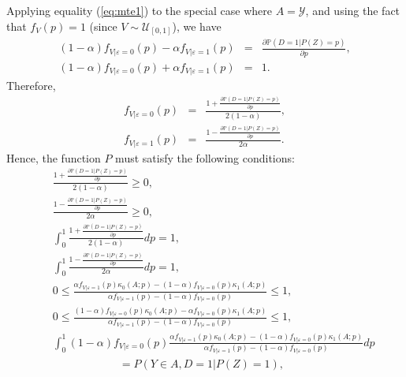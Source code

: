\documentclass[11pt,reqno]{amsart}
\theoremstyle{plain}
\numberwithin{equation}{section}
\begin{document}
Applying equality (\ref{eq:mte1}) to the special case where $A=\mathcal Y$, and using the fact that $f_{V}(p)=1$ (since $V\sim \mathcal U_{[0,1]}$), we have 
\begin{eqnarray*}
(1-\alpha) f_{V\vert \varepsilon=0}(p) - \alpha f_{V\vert \varepsilon=1}(p) &=& \frac{\partial \mathbb P(D=1 \vert P(Z)=p) }{\partial p},\\
(1-\alpha) f_{V\vert \varepsilon=0}(p) +\alpha f_{V\vert \varepsilon=1}(p)&=& 1.
\end{eqnarray*}
Therefore,
\begin{eqnarray*}
f_{V\vert \varepsilon=0}(p)  &=&\frac{1+ \frac{\partial \mathbb P(D=1 \vert P(Z)=p) }{\partial p}}{2(1-\alpha)},\\
f_{V\vert \varepsilon=1}(p)  &=&\frac{1- \frac{\partial \mathbb P(D=1 \vert P(Z)=p) }{\partial p}}{2\alpha}.
\end{eqnarray*}
Hence, the function $P$ must satisfy the following conditions:
\begin{eqnarray}
 && \frac{1+ \frac{\partial \mathbb P(D=1 \vert P(Z)=p) }{\partial p}}{2(1-\alpha)} \geq 0,\label{eq:P1}\\
&&  \frac{1- \frac{\partial \mathbb P(D=1 \vert P(Z)=p) }{\partial p}}{2\alpha} \geq 0, \label{eq:P2}\\
&& \int^1_0  \frac{1+ \frac{\partial \mathbb P(D=1 \vert P(Z)=p) }{\partial p}}{2(1-\alpha)} dp = 1,\label{eq:P3}\\
&& \int^1_0 \frac{1- \frac{\partial \mathbb P(D=1 \vert P(Z)=p) }{\partial p}}{2\alpha} dp = 1 \label{eq:P4},\\
&& 0 \leq \frac{\alpha f_{V\vert \varepsilon=1}(p)\kappa_0(A;p)-\left(1-\alpha\right)f_{V\vert \varepsilon=0}(p)\kappa_1(A;p)}{\alpha f_{V\vert \varepsilon=1}(p)-\left(1-\alpha\right)f_{V\vert \varepsilon=0}(p)} \leq 1, \label{eq:P5}\\
&& 0 \leq \frac{\left(1-\alpha \right) f_{V\vert \varepsilon=0}(p)\kappa_0(A;p)-\alpha f_{V\vert \varepsilon=0}(p)\kappa_1(A;p)}{\alpha f_{V\vert \varepsilon=1}(p)-\left(1-\alpha\right)f_{V\vert \varepsilon=0}(p)} \leq 1, \label{eq:P6}\\
&&\int^1_0 \left(1-\alpha \right) f_{V\vert \varepsilon=0}(p) \frac{\alpha f_{V\vert \varepsilon=1}(p)\kappa_0(A;p)-\left(1-\alpha\right)f_{V\vert \varepsilon=0}(p)\kappa_1(A;p)}{\alpha f_{V\vert \varepsilon=1}(p)-\left(1-\alpha\right)f_{V\vert \varepsilon=0}(p)} dp\nonumber\\
&& \qquad \qquad \qquad \mathbb = P(Y\in A, D=1\vert P(Z)=1), \label{eq:P8}%
\end{eqnarray}
\end{document}
